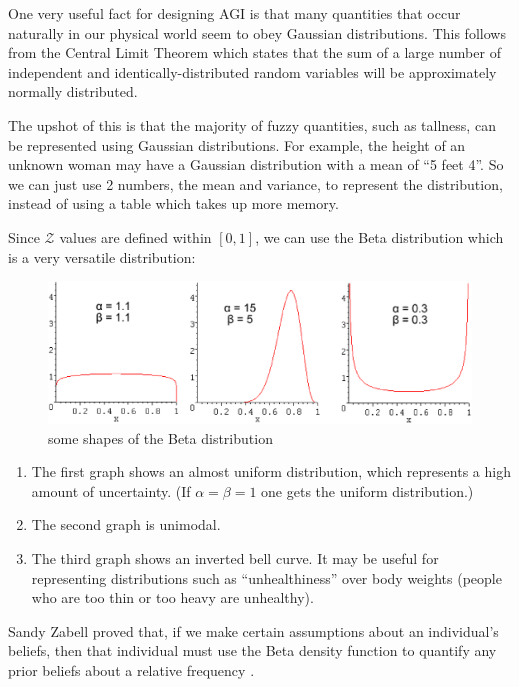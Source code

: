 One very useful fact for designing AGI is that many quantities that occur naturally in our physical world seem to obey Gaussian distributions.  This follows from the Central Limit Theorem which states that the sum of a large number of independent and identically-distributed random variables will be approximately normally distributed.

The upshot of this is that the majority of fuzzy quantities, such as tallness, can be represented using Gaussian distributions.  For example, the height of an unknown woman may have a Gaussian distribution with a mean of ``5 feet 4''.  So we can just use 2 numbers, the mean and variance, to represent the distribution, instead of using a table which takes up more memory.

Since $\mathcal{Z}$ values are defined within $[0,1]$, we can use the Beta distribution which is a very versatile distribution:

\begin{figure}[H]
\centering
\includegraphics[scale=0.65]{BetaDistributions.eps}
\caption{some shapes of the Beta distribution}
\end{figure}

\begin{enumerate}
\item The first graph shows an almost uniform distribution, which represents a high amount of uncertainty. (If $ \alpha = \beta = 1 $ one gets the uniform distribution.)
\item The second graph is unimodal.
\item The third graph shows an inverted bell curve.  It may be useful for representing distributions such as ``unhealthiness'' over body weights (people who are too thin or too heavy are unhealthy).
\end{enumerate}

Sandy Zabell \citep*{Zabell1982} proved that, if we make certain assumptions about an individual's beliefs, then that individual must use the Beta density function to quantify any prior beliefs about a relative frequency \citep*{Neapolitan2004}.

